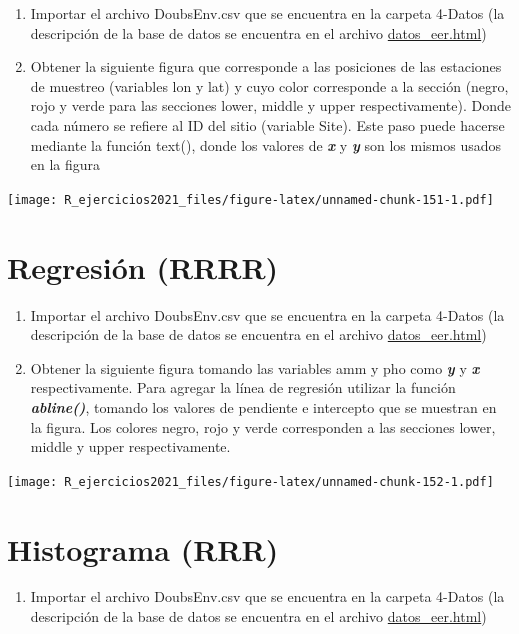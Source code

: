 \documentclass[]{book}
\providecommand{\tightlist}{%
  \setlength{\itemsep}{0pt}\setlength{\parskip}{0pt}}
\begin{document}
\begin{enumerate}
\def\labelenumi{\arabic{enumi}.}
\item
  Importar el archivo DoubsEnv.csv que se encuentra en la carpeta 4-Datos (la descripción de la base de datos se encuentra en el archivo \url{datos_eer.html})
\item
  Obtener la siguiente figura que corresponde a las posiciones de las estaciones de muestreo (variables lon y lat) y cuyo color corresponde a la sección (negro, rojo y verde para las secciones lower, middle y upper respectivamente). Donde cada número se refiere al ID del sitio (variable Site). Este paso puede hacerse mediante la función text(), donde los valores de \emph{\textbf{x}} y \emph{\textbf{y}} son los mismos usados en la figura
\end{enumerate}

\texttt{[image: R\_ejercicios2021\_files/figure-latex/unnamed-chunk-151-1.pdf]}

\hypertarget{regresiuxf3n-rrrr}{%
\section{Regresión (RRRR)}\label{regresiuxf3n-rrrr}}

\begin{enumerate}
\def\labelenumi{\arabic{enumi}.}
\item
  Importar el archivo DoubsEnv.csv que se encuentra en la carpeta 4-Datos (la descripción de la base de datos se encuentra en el archivo \url{datos_eer.html})
\item
  Obtener la siguiente figura tomando las variables amm y pho como \emph{\textbf{y}} y \emph{\textbf{x}} respectivamente. Para agregar la línea de regresión utilizar la función \emph{\textbf{abline()}}, tomando los valores de pendiente e intercepto que se muestran en la figura. Los colores negro, rojo y verde corresponden a las secciones lower, middle y upper respectivamente.
\end{enumerate}

\texttt{[image: R\_ejercicios2021\_files/figure-latex/unnamed-chunk-152-1.pdf]}

\hypertarget{histograma-rrr}{%
\section{Histograma (RRR)}\label{histograma-rrr}}

\begin{enumerate}
\def\labelenumi{\arabic{enumi}.}
\tightlist
\item
  Importar el archivo DoubsEnv.csv que se encuentra en la carpeta 4-Datos (la descripción de la base de datos se encuentra en el archivo \url{datos_eer.html})
\end{enumerate}
\end{document}
